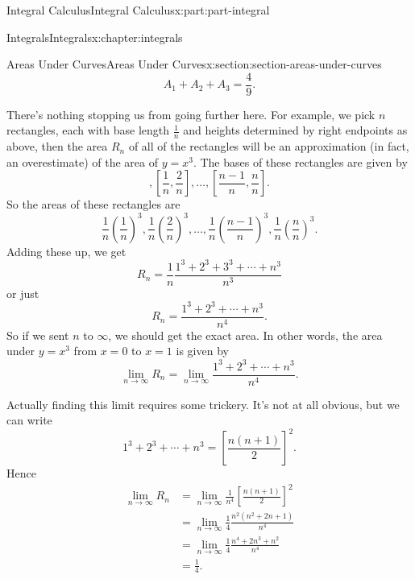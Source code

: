\documentclass[twoside,10pt,]{book}
\numberwithin{equation}{part}
\begin{document}
\begin{partptx}{Integral Calculus}{}{Integral Calculus}{}{}{x:part:part-integral}
\begin{chapterptx}{Integrals}{}{Integrals}{}{}{x:chapter:integrals}
\begin{sectionptx}{Areas Under Curves}{}{Areas Under Curves}{}{}{x:section:section-areas-under-curves}
\begin{equation*}
A_{1} + A_{2} + A_{3} = \frac{4}{9}.
\end{equation*}
%
\par
There's nothing stopping us from going further here. For example, we pick \(n\) rectangles, each with base length \(\frac{1}{n}\) and heights determined by right endpoints as above, then the area \(R_{n}\) of all of the rectangles will be an approximation (in fact, an overestimate) of the area of \(y = x^{3}\). The bases of these rectangles are given by%
\begin{equation*}
[0,\frac{1}{n}], [\frac{1}{n},\frac{2}{n}],\ldots,[\frac{n-1}{n},\frac{n}{n}].
\end{equation*}
So the areas of these rectangles are%
\begin{equation*}
\frac{1}{n}\left(\frac{1}{n}\right)^{3}, \frac{1}{n}\left(\frac{2}{n}\right)^{3},\ldots,\frac{1}{n}\left(\frac{n-1}{n}\right)^{3}, \frac{1}{n}\left(\frac{n}{n}\right)^{3}.
\end{equation*}
Adding these up, we get%
\begin{equation*}
R_{n} = \frac{1}{n}\frac{1^{3}+2^{3} + 3^{3} + \cdots + n^{3}}{n^{3}}
\end{equation*}
or just%
\begin{equation*}
R_{n} = \frac{1^{3} + 2^{3} + \cdots + n^{3}}{n^{4}}.
\end{equation*}
So if we sent \(n\) to \(\infty\), we should get the exact area. In other words, the area under \(y=x^{3}\) from \(x=0\) to \(x=1\) is given by%
\begin{equation*}
\lim_{n\to\infty}R_{n} = \lim_{n\to\infty}\frac{1^{3} + 2^{3} + \cdots + n^{3}}{n^{4}}.
\end{equation*}
%
\par
Actually finding this limit requires some trickery. It's not at all obvious, but we can write%
\begin{equation*}
1^{3} + 2^{3} + \cdots + n^{3} = \left[\frac{n(n+1)}{2}\right]^{2}.
\end{equation*}
Hence%
\begin{align*}
\lim_{n\to\infty}R_{n} & = \lim_{n\to\infty}\frac{1}{n^{4}}\left[\frac{n(n+1)}{2}\right]^{2} \\
& = \lim_{n\to\infty}\frac{1}{4}\frac{n^{2}(n^{2}+2n+1)}{n^{4}} \\
& = \lim_{n\to\infty}\frac{1}{4}\frac{n^{4} + 2n^{3} + n^{2}}{n^{4}} \\
& = \frac{1}{4}. 
\end{align*}

\end{sectionptx}
\end{chapterptx}
\end{partptx}
\end{document}
